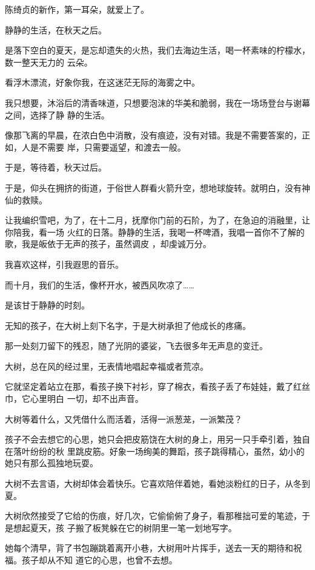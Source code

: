 \documentclass[12pt,a4paper]{article}
\def\blankrev{\vspace{1ex}}									%
\begin{document}
		陈绮贞的新作，第一耳朵，就爱上了。

		静静的生活，在秋天之后。

		是落下空白的夏天，是忘却遗失的火热，我们去海边生活，喝一杯素味的柠檬水，数一整天无力的
	云朵。

		看浮木漂流，好象你我，在这迷茫无际的海雾之中。


		我只想要，沐浴后的清香味道，只想要泡沫的华美和脆弱，我在一场场登台与谢幕之间，选择了静
	静的生活。

		像那飞离的早晨，在浓白色中消散，没有痕迹，没有对错。我是不需要答案的，正如，人是不需要
	岸，只需要遥望，和渡去一般。


		于是，等待着，秋天过后。

		于是，仰头在拥挤的街道，于俗世人群看火箭升空，想地球旋转。就明白，没有神仙的救赎。

		让我编织雪吧，为了，在十二月，抚摩你门前的石阶，为了，在急迫的消融里，让你陪我，看一场
	火红的日落。静静的生活，我喝一杯啤酒，我唱一首你不了解的歌，我是皈依于无声的孩子，虽然调皮
	，却虔诚万分。


		\blankrev
		我喜欢这样，引我遐思的音乐。

		而十月，我们的生活，像杯开水，被西风吹凉了……

		是该甘于静静的时刻。

	\endwriting



		无知的孩子，在大树上刻下名字，于是大树承担了他成长的疼痛。

		那一处刻刀留下的残忍，随了光阴的婆娑，飞去很多年无声息的变迁。

		大树，总在风的经过里，无表情地唱起幸福或者荒凉。

		它就坚定着站立在那，看孩子换下衬衫，穿了棉衣，看孩子丢了布娃娃，戴了红丝巾，它心里明白
	一切，却不出声音。

		大树等着什么，又凭借什么而活着，活得一派葱茏，一派繁茂？

		孩子不会去想它的心思，她只会把皮筋饶在大树的身上，用另一只手牵引着，独自在落叶纷纷的秋
	里跳皮筋。好象一场绚美的舞蹈，孩子跳得精心，虽然，幼小的她只有那么孤独地玩耍。

		大树不去言语，大树却体会着快乐。它喜欢陪伴着她，看她淡粉红的日子，从冬到夏。

		大树欣然接受了它给的伤痕，好几次，它偷偷俯了身子，看那稚拙可爱的笔迹，于是想起夏天，孩
	子搬了板凳躲在它的树阴里一笔一划地写字。

		她每个清早，背了书包蹦跳着离开小巷，大树用叶片挥手，送去一天的期待和祝福。孩子却从不知
	道它的心思，也曾不去想。
\end{document}
